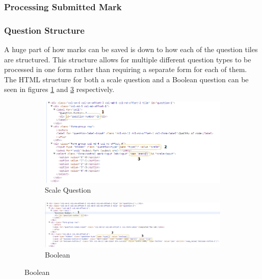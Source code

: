 \documentclass[12pt]{article}  %
\begin{document}
\subsubsection{Processing Submitted Mark}

\subsubsection*{Question Structure}

A huge part of how marks can be saved is down to how each of the question tiles are structured. This structure allows for multiple different question types to be processed in one form rather than requiring a separate form for each of them. The HTML structure for both a scale question and a Boolean question can be seen in figures \ref{fig:struct-scale} and \ref{fig:struct-bool} respectively.  

\begin{figure}[H]
\caption{HTML Structure Of Questions}
\centering
\begin{subfigure}[c]{0.45\textwidth}
    \includegraphics[width=1\textwidth]{images/implementation/question-structure-scale.png}
    \caption{Scale Question}
    \label{fig:struct-scale}
\end{subfigure}
\hfill
\begin{subfigure}[c]{0.45\textwidth}
    \includegraphics[width=1\textwidth]{images/implementation/question-structure-boolean.png}
    \caption{Boolean}
    \label{fig:struct-bool}
\end{subfigure}

\end{figure}
\end{document}
